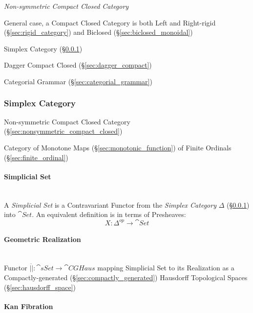 \emph{Non-symmetric Compact Closed Category}

General case, a Compact Closed Category is both Left and Right-rigid
(\S\ref{sec:rigid_category}) and Biclosed
(\S\ref{sec:biclosed_monoidal})

Simplex Category (\S\ref{sec:simplex_category})

Dagger Compact Closed (\S\ref{sec:dagger_compact})

Categorial Grammar (\S\ref{sec:categorial_grammar})



\subsubsection{Simplex Category}\label{sec:simplex_category}

Non-symmetric Compact Closed Category
(\S\ref{sec:nonsymmetric_compact_closed})

Category of Monotone Maps (\S\ref{sec:monotonic_function}) of Finite
Ordinals (\S\ref{sec:finite_ordinal})



\paragraph{Simplicial Set}\label{sec:simplicial_set}
\hfill \\

A \emph{Simplicial Set} is a Contravariant Functor from the
\emph{Simplex Category} $\Delta$ (\S\ref{sec:simplex_category}) into
$\cat{Set}$. An equivalent definition is in terms of Presheaves:
\[
  X: \Delta^{op} \rightarrow \cat{Set}
\]



\paragraph{Geometric Realization}\label{sec:geometric_realization}
\hfill \\

Functor $|\dot| : \cat{sSet} \rightarrow \cat{CGHaus}$ mapping
Simplicial Set to its Realization as a Compactly-generated
(\S\ref{sec:compactly_generated}) Hausdorff Topological Spaces
(\S\ref{sec:hausdorff_space})



\paragraph{Kan Fibration}\label{sec:kan_fibration}

